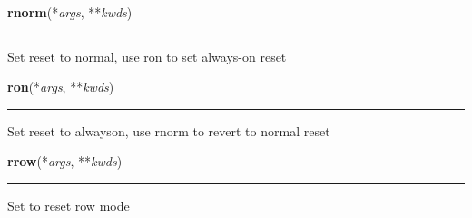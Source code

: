     \label{dsp:rnorm}

    \vspace{0.5ex}

    \begin{boxedminipage}{\textwidth}

    \raggedright \textbf{rnorm}(*\textit{args}, **\textit{kwds})

    \vspace{-1.5ex}

    \rule{\textwidth}{0.5\fboxrule}
    Set reset to normal, use ron to set always-on reset

    \vspace{1ex}

    \end{boxedminipage}

    \label{dsp:ron}

    \vspace{0.5ex}

    \begin{boxedminipage}{\textwidth}

    \raggedright \textbf{ron}(*\textit{args}, **\textit{kwds})

    \vspace{-1.5ex}

    \rule{\textwidth}{0.5\fboxrule}
    Set reset to alwayson, use rnorm to revert to normal reset

    \vspace{1ex}

    \end{boxedminipage}

    \label{dsp:rrow}

    \vspace{0.5ex}

    \begin{boxedminipage}{\textwidth}

    \raggedright \textbf{rrow}(*\textit{args}, **\textit{kwds})

    \vspace{-1.5ex}

    \rule{\textwidth}{0.5\fboxrule}
    Set to reset row mode

    \vspace{1ex}

    \end{boxedminipage}

